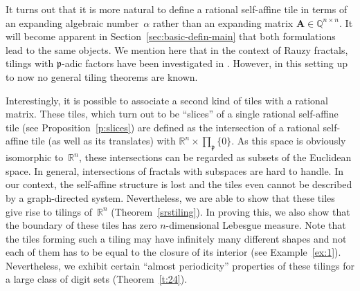 \documentclass[12pt]{amsart}
\theoremstyle{definition}
\theoremstyle{remark}
\numberwithin{equation}{section}
\begin{document}
It turns out that it is more natural to define a rational self-affine tile in terms of an expanding algebraic number~$\alpha$ rather than an expanding matrix $\mathbf{A} \in \mathbb{Q}^{n\times n}$. It will become apparent in Section~\ref{sec:basic-defin-main} that both formulations lead to the same objects. We mention here that in the context of Rauzy fractals, tilings with $\mathfrak{p}$-adic factors have been investigated in \cite{Siegel:03,ABBS:08}. However, in this setting up to now no general tiling theorems are known.

Interestingly, it is possible to associate a second kind of tiles with a rational matrix. These tiles, which turn out to be ``slices'' of a single rational self-affine tile (see Proposition~\ref{p:slices}) are defined as the intersection of a rational self-affine tile (as well as its translates) with $\mathbb{R}^n\times \prod_\mathfrak{p} \{0\}$. As this space is obviously isomorphic to~$\mathbb{R}^n$, these intersections can be regarded as subsets of the Euclidean space. In general, intersections of fractals with subspaces are hard to handle. In our context, the self-affine structure is lost and the tiles even cannot be described by a graph-directed system. Nevertheless, we are able to show that these tiles give rise to tilings of~$\mathbb{R}^n$ (Theorem~\ref{srstiling}). In proving this, we also show that the boundary of these tiles has zero $n$-dimensional Lebesgue measure. Note that the tiles forming such a tiling may have infinitely many different shapes and not each of them has to be equal to the closure of its interior (see Example~\ref{ex:1}). Nevertheless, we exhibit certain ``almost periodicity'' properties of these tilings for a large class of digit sets (Theorem~\ref{t:24}).
\end{document}
